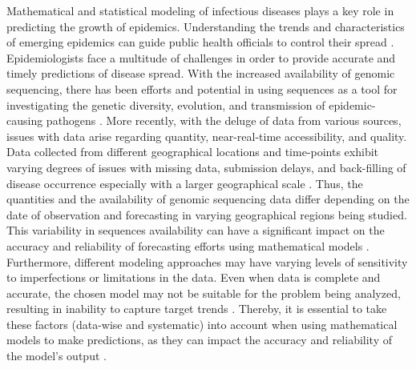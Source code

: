 \documentclass[11pt,oneside,letterpaper]{article}
\begin{document}
Mathematical and statistical modeling of infectious diseases plays a key role in predicting the growth of epidemics.
Understanding the trends and characteristics of emerging epidemics can guide public health officials to control their spread \cite{ding_value_2021}. 
Epidemiologists face a multitude of challenges in order to provide accurate and timely predictions of disease spread.
With the increased availability of genomic sequencing, there has been efforts and potential in using sequences as a tool for investigating the genetic diversity, evolution, and transmission of epidemic-causing pathogens \cite{gire_genomic_2014,zhou_pneumonia_2020}. 
More recently, with the deluge of data from various sources, issues with data arise regarding quantity, near-real-time accessibility, and quality.
Data collected from different geographical locations and time-points exhibit varying degrees of issues with missing data, submission delays, and back-filling of disease occurrence especially with a larger geographical scale \cite{crepey_challenges_2022}.
Thus, the quantities and the availability of genomic sequencing data differ depending on the date of observation and forecasting in varying geographical regions being studied.
This variability in sequences availability can have a significant impact on the accuracy and reliability of forecasting efforts using mathematical models \cite{suchard_bayesian_2018}.
Furthermore, different modeling approaches may have varying levels of sensitivity to imperfections or limitations in the data.
Even when data is complete and accurate, the chosen model may not be suitable for the problem being analyzed, resulting in inability to capture target trends \cite{gelman_bayesian_2013}.
Thereby, it is essential to take these factors (data-wise and systematic) into account when using mathematical models to make predictions, as they can impact the accuracy and reliability of the model's output \cite{crepey_challenges_2022}.
\end{document}
